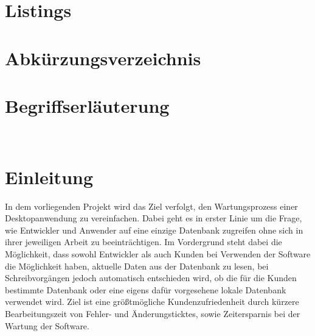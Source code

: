 \documentclass[11pt,toc=sectionentrywithoutdots, 
headheight=44pt, headings=optiontoheadandtoc, hyperfootnotes=false]{scrartcl}
\begin{document}
\newpage
\setcounter{page}{1}


\tableofcontents


\setcounter{secnumdepth}{0}

\newpage

\listoffigures




\newpage

\listoftables
\newpage

\section{Listings}
\blindtext\blindtext\blindtext
\newpage

\section{Abkürzungsverzeichnis}


\begin{acronym}[xxxxxxx]


\end{acronym}

\newpage

\section{Begriffserläuterung}
\blindtext\
\newpage

\setcounter{secnumdepth}{1}
\setcounter{secnumdepth}{4}

\section{Einleitung}
In dem vorliegenden Projekt wird das Ziel verfolgt, den Wartungsprozess einer Desktopanwendung zu vereinfachen. Dabei geht es in erster Linie um die Frage, wie Entwickler und Anwender auf eine einzige Datenbank zugreifen ohne sich in ihrer jeweiligen Arbeit zu beeinträchtigen. Im Vordergrund steht dabei die Möglichkeit, dass sowohl Entwickler als auch Kunden bei Verwenden der Software die Möglichkeit haben, aktuelle Daten aus der Datenbank zu lesen, bei Schreibvorgängen jedoch automatisch entschieden wird, ob die für die Kunden bestimmte Datenbank oder eine eigens dafür vorgesehene lokale Datenbank verwendet wird. Ziel ist eine größtmögliche Kundenzufriedenheit durch kürzere Bearbeitungszeit von Fehler- und Änderungsticktes, sowie Zeitersparnis bei der Wartung der Software.
\end{document}
